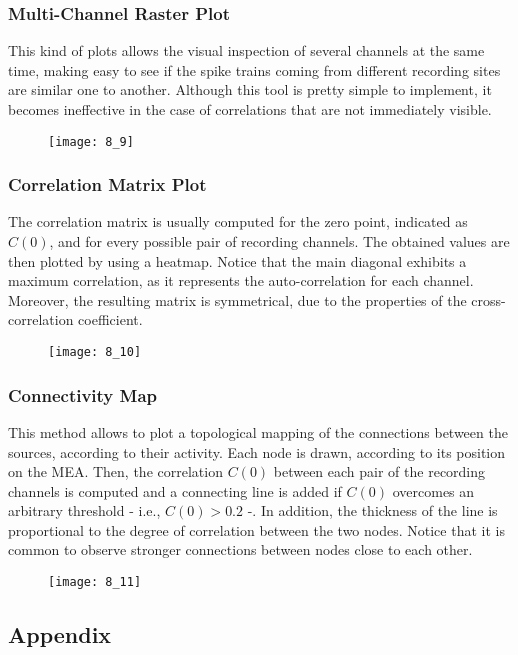 \subsubsection{Multi-Channel Raster Plot}
This kind of plots allows the visual inspection of several channels at the same time, making
easy to see if the spike trains coming from different recording sites are similar one to
another. Although this tool is pretty simple to implement, it becomes ineffective in the
case of correlations that are not immediately visible.
\begin{figure}[H]
    \texttt{[image: 8\_9]}
    \centering
\end{figure}
\subsubsection{Correlation Matrix Plot}
The correlation matrix is usually computed for the zero point, indicated as \(C(0)\), and
for every possible pair of recording channels. The obtained values are then plotted by using
a heatmap. Notice that the main diagonal exhibits a maximum correlation, as it represents
the auto-correlation for each channel. Moreover, the resulting matrix is symmetrical, due to
the properties of the cross-correlation coefficient.
\begin{figure}[H]
    \texttt{[image: 8\_10]}
    \centering
\end{figure}
\subsubsection{Connectivity Map}
This method allows to plot a topological mapping of the connections between the sources,
according to their activity. Each node is drawn, according to its position on the MEA. Then,
the correlation \(C(0)\) between each pair of the recording channels is computed and a
connecting line is added if \(C(0)\) overcomes an arbitrary threshold - i.e., \(C(0)>0.2\) -.
In addition, the thickness of the line is proportional to the degree of correlation between
the two nodes. Notice that it is common to observe stronger connections between nodes close
to each other.
\begin{figure}[H]
    \texttt{[image: 8\_11]}
    \centering
\end{figure}

\subsection{Appendix}
